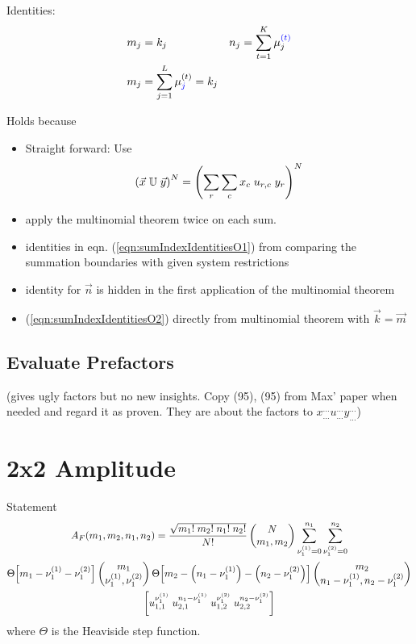 \documentclass[
	english,
	a4paper,
	fontsize=10pt,
	parskip=half,
	titlepage=true,
	DIV=12,
	final
]{scrreprt}
\begin{document}
Identities:
\begin{align}
	m_j &= k_j
&
	n_j &= \sum_{{\color{blue}} t=1}^{K} \mu_{j}^{{\color{blue} (t)}}
	\label{eqn:sumIndexIdentitiesO1}
\\
	m_j &= \sum_{{\color{blue}} j=1}^{L} \mu_{{\color{blue} j}}^{(t)} = k_j
	\label{eqn:sumIndexIdentitiesO2}
\end{align}

Holds because
\begin{itemize}
\item Straight forward: Use
	\begin{equation}
		\qty( \vec{x} \; \mathbb{U} \; \vec{y} )^N
		=
		\qty( \sum_{r} \sum_{c} x_c \; u_{r,c} \; y_r )^N
	\end{equation}

\item apply the multinomial theorem twice on each sum.
\item identities in eqn. (\ref{eqn:sumIndexIdentitiesO1}) from comparing the summation boundaries with
	given system restrictions
\item identity for $\vec{n}$ is hidden in the first application of the multinomial theorem
\item (\ref{eqn:sumIndexIdentitiesO2}) directly from multinomial theorem with $\vec{k} = \vec{m}$
\end{itemize}


\subsection{Evaluate Prefactors}
(gives ugly factors but no new insights. Copy (95), (95) from Max' paper when needed and regard it as proven. They are about the factors to $x_{\ldots}^{\ldots} u_{\ldots}^{\ldots} y_{\ldots}^{\ldots}$)

\section{2x2 Amplitude}
Statement
\begin{multline}
	A_F (m_1, m_2, n_1, n_2)
=
	\frac{\sqrt{m_1! \; m_2! \; n_1! \; n_2!}}{N!}
	\begin{pmatrix}
		N \\ m_1, m_2
	\end{pmatrix}
	\sum_{\nu_1^{(1)} = 0}^{n_1}
	\sum_{\nu_1^{(2)} = 0}^{n_2}
\\
	\Theta\qty[ m_1 - \nu_1^{(1)} - \nu_1^{(2)} ]
	\begin{pmatrix}
		m_1 \\ \nu_1^{(1)}, \nu_1^{(2)}
	\end{pmatrix}
	\Theta\qty[ m_2 - \qty(n_1 - \nu_1^{(1)})  - \qty(n_2 - \nu_1^{(2)}) ]
	\begin{pmatrix}
		m_2 \\ n_1 - \nu_1^{(1)} , n_2 - \nu_1^{(2)}
	\end{pmatrix}
\\
	\qty[
		u_{1,1}^{\nu_1^{(1)}} \; u_{2,1}^{n_1 - \nu_1^{(1)}} \;
		u_{1,2}^{\nu_1^{(2)}} \; u_{2,2}^{n_2 - \nu_1^{(2)}}
	]
\end{multline}
where $\Theta$ is the Heaviside step function.
\end{document}
